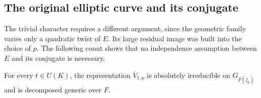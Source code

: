 \subsection{The original elliptic curve and its conjugate}

The trivial character requires a different argument, since the
geometric family varies only a quadratic twist of $E$.  Its large
residual image was built into the choice of $p$.  The following
count shows that no independence assumption between $E$ and its
conjugate is necessary.

\begin{lemma}\label{res:trivial-character}
For every $t\in U(K)$, the representation
$\overline V_{1,p}$ is absolutely irreducible on $G_{F(\zeta_p)}$
and is decomposed generic over $F$.
\end{lemma}

